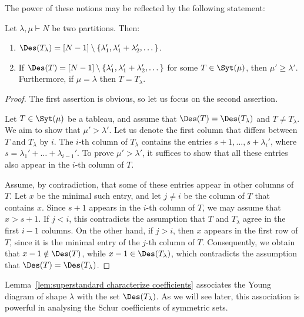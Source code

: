 
The power of these notions may be reflected by the following statement:
\begin{lemma}
\label{lem:superstandard characterize coefficients}
    Let $\lambda, \mu \vdash N$ be two partitions. Then:
    \begin{enumerate}
        \item $\Des(T_\lambda) = [N-1] \setminus \{\lambda_{1}', \lambda_{1}'+\lambda_{2}', \dots\}$.
        \item If $\Des(T) = [N-1] \setminus \{\lambda_{1}', \lambda_{1}'+\lambda_{2}', \dots\}$ for some $T \in \Syt(\mu)$, then $\mu' \ge \lambda'$. Furthermore, if $\mu = \lambda$ then $T = T_\lambda$.
    \end{enumerate}
\end{lemma}
    
    


\begin{proof}
    The first assertion is obvious, so let us focus on the second assertion.
    
    Let $T \in \Syt(\mu)$ be a tableau, and assume that $\Des(T) = \Des(T_\lambda)$ and $T \ne T_\lambda$. We aim to show that $\mu' > \lambda'$. Let us denote the first column that differs between $T$ and $T_\lambda$ by $i$. The $i$-th column of $T_\lambda$ contains the entries $s+1,\dots,s+\lambda_{i}'$, where $s = \lambda_1' + \dots + \lambda_{i-1}'$. To prove $\mu' > \lambda'$, it suffices to show that all these entries also appear in the $i$-th column of $T$.
    
    Assume, by contradiction, that some of these entries appear in other columns of $T$. Let $x$ be the minimal such entry, and let $j \ne i$ be the column of $T$ that contains $x$. Since $s+1$ appears in the $i$-th column of $T$, we may assume that $x > s+1$. If $j < i$, this contradicts the assumption that $T$ and $T_\lambda$ agree in the first $i-1$ columns. On the other hand, if $j > i$, then $x$ appears in the first row of $T$, since it is the minimal entry of the $j$-th column of $T$. Consequently, we obtain that $x-1 \notin \Des(T)$, while $x-1 \in \Des(T_\lambda)$, which contradicts the assumption that $\Des(T) = \Des(T_\lambda)$.
\end{proof}

Lemma~\ref{lem:superstandard characterize coefficients} associates the Young diagram of shape $\lambda$ with the set $\Des(T_\lambda)$. As we will see later, this association is powerful in analysing the Schur coefficients of symmetric sets.


